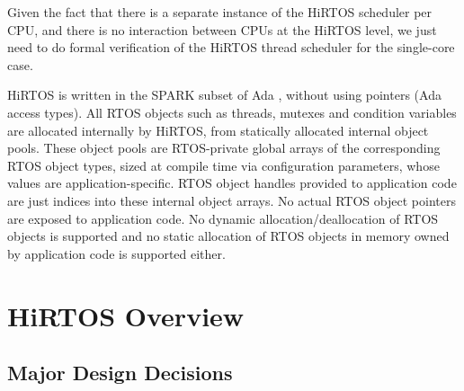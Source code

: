 \documentclass{AUJarticle}
\begin{document}
Given the fact that there is a separate instance of the HiRTOS scheduler per CPU,
and there is no interaction between CPUs at the HiRTOS level, we just need to do
formal verification of the HiRTOS thread scheduler for the single-core case.

HiRTOS is written in the SPARK subset of Ada \cite{SparkAda}, without using pointers (Ada access types).
All RTOS objects such as threads, mutexes and condition variables are allocated internally
by HiRTOS, from statically allocated internal object pools. 
These object pools are RTOS-private global arrays of the corresponding RTOS object types,
sized at compile time via configuration parameters, whose values are application-specific.
RTOS object handles provided to application code are just indices into these internal object arrays.
No actual RTOS object pointers are exposed to application code.
No dynamic allocation/deallocation of RTOS objects is supported and no static allocation of RTOS
objects in memory owned by application code is supported either.

\section{HiRTOS Overview}

\subsection{Major Design Decisions}
\end{document}

